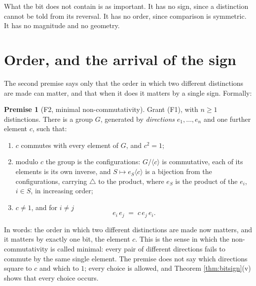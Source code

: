 \documentclass[11pt]{article}
\theoremstyle{plain}
\theoremstyle{definition}
\theoremstyle{plain}
\theoremstyle{definition}
\newtheorem*{premise}{Premise}
\begin{document}
What the bit does not contain is as important. It has no sign, since a distinction cannot be told from its reversal. It has no order, since comparison is symmetric. It has no magnitude and no geometry.

\section{Order, and the arrival of the sign}\label{sec:sign}

The second premise says only that the order in which two different distinctions are made can matter, and that when it does it matters by a single sign. Formally:

\begin{premise}[F2, minimal non-commutativity]
Grant (F1), with $n \geq 1$ distinctions. There is a group $G$, generated by \emph{directions} $e_{1}, \dots, e_{n}$ and one further element $c$, such that:
\begin{enumerate}
\item[(F2a)] $c$ commutes with every element of $G$, and $c^{2} = 1$;
\item[(F2b)] modulo $c$ the group is the configurations: $G/\langle c \rangle$ is commutative, each of its elements is its own inverse, and $S \mapsto e_{S}\langle c\rangle$ is a bijection from the configurations, carrying $\triangle$ to the product, where $e_{S}$ is the product of the $e_{i}$, $i \in S$, in increasing order;
\item[(F2c)] $c \neq 1$, and for $i \neq j$
\[
e_{i}\,e_{j} \;=\; c\,e_{j}\,e_{i} .
\]
\end{enumerate}
\end{premise}

In words: the order in which two different distinctions are made now matters, and it matters by exactly one bit, the element $c$. This is the sense in which the non-commutativity is called minimal: every pair of different directions fails to commute by the same single element. The premise does not say which directions square to $c$ and which to $1$; every choice is allowed, and Theorem \ref{thm:bitsign}(v) shows that every choice occurs.
\end{document}

